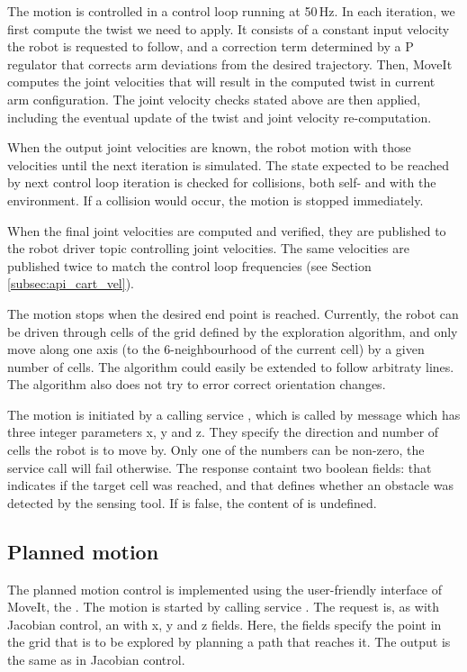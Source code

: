 \documentclass[buriama8_dp.tex]{subfiles}
\begin{document}
The motion is controlled in a control loop running at 50\,Hz. In each iteration, we first compute the twist we need to apply. It consists of a constant input velocity the robot is requested to follow, and a correction term determined by a P regulator that corrects arm deviations from the desired trajectory. Then, MoveIt computes the joint velocities that will result in the computed twist in current arm configuration. The joint velocity checks stated above are then applied, including the eventual update of the twist and joint velocity re-computation.

When the output joint velocities are known, the robot motion with those velocities until the next iteration is simulated. The state expected to be reached by next control loop iteration is checked for collisions, both self- and with the environment. If a collision would occur, the motion is stopped immediately.

When the final joint velocities are computed and verified, they are published to the robot driver topic controlling joint velocities. The same velocities are published twice to match the control loop frequencies (see Section \ref{subsec:api_cart_vel}).

The motion stops when the desired end point is reached. Currently, the robot can be driven through cells of the grid defined by the exploration algorithm, and only move along one axis (to the 6-neighbourhood of the current cell) by a given number of cells. The algorithm could easily be extended to follow arbitraty lines. The algorithm also does not try to error correct orientation changes.

The motion is initiated by a calling service , which is called by message   which has three integer parameters \m x, \m y and \m z. They specify the direction and number of cells the robot is to move by. Only one of the numbers can be non-zero, the service call will fail otherwise. The response containt two boolean fields:  that indicates if the target cell was reached, and  that defines whether an obstacle was detected by the sensing tool. If  is false, the content of  is undefined.

\subsection{Planned motion}
\label{subsec:impl_drv_plan}

The planned motion control is implemented using the user-friendly interface of MoveIt, the . The motion is started by calling service . The request is, as with Jacobian control, an  with \m x, \m y and \m z fields. Here, the fields specify the point in the grid that is to be explored by planning a path that reaches it. The output is the same as in Jacobian control.
\end{document}
